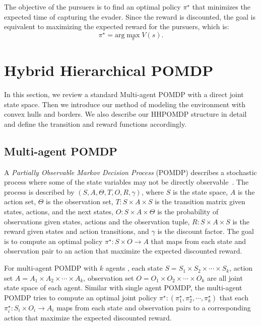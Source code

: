 \documentclass[../main.tex]{subfiles}
\begin{document}
The objective of the pursuers is to find an optimal policy $\pi^\star$ that minimizes the expected time of capturing the evader. Since the reward is discounted, the goal is equivalent to maximizing the expected reward for the pursuers, which is: 
\begin{equation}
\pi^\star = \text{arg} \max_{\pi}{V(s)}. 
\end{equation}


\section{Hybrid Hierarchical POMDP} \label{sec:HHPOMDP}
In this section, we review a standard Multi-agent POMDP with a direct joint state space. Then we introduce our method of modeling the environment with convex hulls and borders. We also describe our HHPOMDP structure in detail and define the transition and reward functions accordingly.

\subsection{Multi-agent POMDP} \label{sec:MPOMDP}
A \textit{Partially Observable Markov Decision Process} (POMDP) describes a stochastic process
where some of the state variables may not be directly observable~\cite{hauskrecht2000value}.
The process is described by $(S, A, \Theta, T, O, R, \gamma)$, where $S$ is the state space, $A$ is the action set, $\Theta$ is the observation set, $T:S \times A \times S$ is the transition matrix given states, actions, and the next states, $O: S \times A \times \Theta$ is the probability of observations given states, actions and the observation tuple, $R: S \times A \times S$ is the reward given states and action transitions, and $\gamma$ is the discount factor. The goal is to compute an optimal policy $\pi^\star: S \times O \rightarrow A$ that maps from each state and observation pair to an action that maximize the expected discounted reward. 

For multi-agent POMDP with $k$ agents \cite{pynadath2002communicative}, each state $S = S_1 \times S_2 \times \cdots \times S_k$, action set $A = A_1 \times A_2 \times \cdots \times A_k$, observation set $O = O_1 \times O_2 \times \cdots \times O_k$ are all joint state space of each agent. Similar with single agent POMDP, the multi-agent POMDP tries to compute an optimal joint policy $\pi^\star: (\pi_1^\star, \pi_2^\star, \cdots, \pi_k^\star)$ that each $\pi_i^\star: S_i \times O_i \rightarrow A_i$ maps from each state and observation pairs to a corresponding action that maximize the expected discounted reward.
\end{document}
